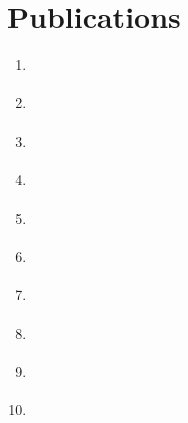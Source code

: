 \normalsize
\section{Publications}
\begin{enumerate}

	\item {} \label{ans_2018} \vspace{4mm}
	\item {} \label{ans_2017} \vspace{4mm}
	\item {} \label{nair} \vspace{4mm}
	\item {} \label{aries} \vspace{4mm}
	\item {} \label{ans_2013} \vspace{4mm}
	\item {} \label{fy12} \vspace{4mm}
	\item {} \label{mcnp6_um} \vspace{4mm}
	\item {} \label{mst1} \vspace{4mm}
	\item {} \label{mst2} \vspace{4mm}
	\item {} \label{uga} \vspace{4mm}
	
\end{enumerate}



